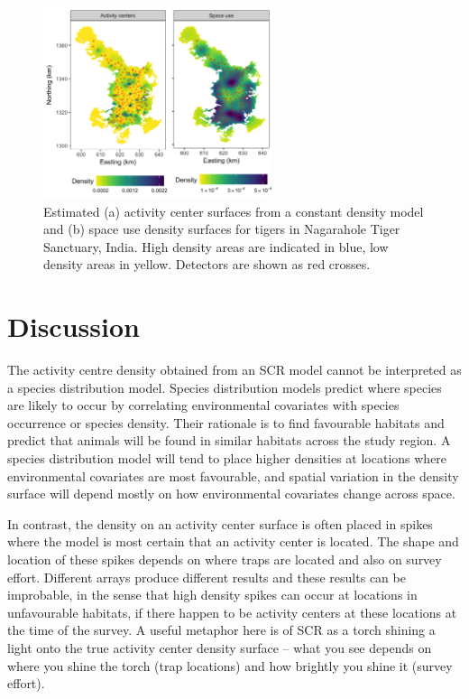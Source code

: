 \documentclass[a4paper,12pt]{article}
\begin{document}
\begin{figure}[htbp]
\centering
\includegraphics[width=0.6\textwidth]{tiger_spaceuse}
\caption{Estimated (a) activity center surfaces from a constant density model and (b) space use density surfaces for tigers in Nagarahole Tiger Sanctuary, India. High density areas are indicated in blue, low density areas in yellow. Detectors are shown as red crosses.}
\label{tigerspaceuse}
\end{figure}


\section{Discussion}
The activity centre density obtained from an SCR model cannot be interpreted as a species distribution model. Species distribution models predict where species are likely to occur by correlating environmental covariates with species occurrence or species density. Their rationale is to find favourable habitats and predict that animals will be found in similar habitats across the study region. A species distribution model will tend to place higher densities at locations where environmental covariates are most favourable, and spatial variation in the density surface will depend mostly on how environmental covariates change across space.

In contrast, the density on an activity center surface is often placed in spikes where the model is most certain that an activity center is located. The shape and location of these spikes depends on where traps are located and also on survey effort. Different arrays produce different results and these results can be improbable, in the sense that high density spikes can occur at locations in unfavourable habitats, if there happen to be activity centers at these locations at the time of the survey. A useful metaphor here is of SCR as a torch shining a light onto the true activity center density surface -- what you see depends on where you shine the torch (trap locations) and how brightly you shine it (survey effort). 
\end{document}
